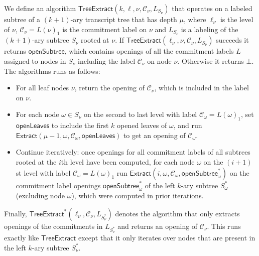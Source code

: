 \begin{definition}\label{def:TreeExtract}

We define an algorithm $\textsf{TreeExtract}(k, \ell, \nu, \mathcal{C}_\nu, L_{S_\nu})$ that operates on a labeled subtree of a $(k+1)$-ary transcript tree that has depth $\mu$,  where $\ell_\nu$ is the level of $\nu$, $\mathcal{C}_\nu = L(\nu)_1$ is the commitment label on $\nu$ and $L_{S_\nu}$ is a labeling of the $(k+1)$-ary subtree $S_\nu$ rooted at $\nu$. If $\textsf{TreeExtract}(\ell_\nu, \nu, \mathcal{C}_\nu, L_{S_\nu})$ succeeds it returns $\textsf{openSubtree}$, which contains openings of all the commitment labels $L$ assigned to nodes in $S_\nu$ including the label $\mathcal{C}_\nu$ on node $\nu$. Otherwise it returns $\bot$. The algorithms runs as follows: 
\begin{itemize}  
\item For all leaf nodes $\nu$, return the opening of $\mathcal{C}_\nu$, which is included in the label on $\nu$. \
\item For each node $\omega \in S_{\nu}$ on the second to last level with label $\mathcal{C}_\omega = L(\omega)_1$, set $\textsf{openLeaves}$ to include the first $k$ opened leaves of $\omega$, and run $\textsf{Extract}(\mu - 1, \omega, \mathcal{C}_\omega, \textsf{openLeaves})$ to get an opening of $\mathcal{C}_\omega$.
\item Continue iteratively: once openings for all commitment labels of all subtrees rooted at the $i$th level have been computed, for each node $\omega$ on the $(i+1)$st level with label $\mathcal{C}_\omega = L(\omega)_1$ run $\textsf{Extract}(i, \omega, \mathcal{C}_\omega, \textsf{openSubtree}^*_\omega)$ on the commitment label openings $\textsf{openSubtree}^*_\omega$ of the left $k$-ary subtree $S^*_\omega$ (excluding node $\omega$), which were computed in prior iterations. 
\end{itemize}
Finally, $\textsf{TreeExtract}^*(\ell_\nu, \mathcal{C}_\nu, L_{S^*_\nu})$ denotes the algorithm that only extracts openings of the commitments in $L_{S^*_\nu}$ and returns an opening of $\mathcal{C}_\nu$. This runs exactly like $\textsf{TreeExtract}$ except that it only iterates over nodes that are present in the left $k$-ary subtree $S^*_\nu$. 
\end{definition}

